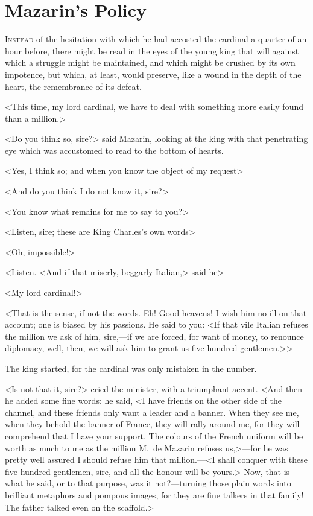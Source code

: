 \chapter{Mazarin's Policy}

\lettrine{I}{nstead} of the hesitation with which he had accosted the cardinal a quarter of an hour before, there might be read in the eyes of the young king that will against which a struggle might be maintained, and which might be crushed by its own impotence, but which, at least, would preserve, like a wound in the depth of the heart, the remembrance of its defeat.

<This time, my lord cardinal, we have to deal with something more easily found than a million.>

<Do you think so, sire?> said Mazarin, looking at the king with that penetrating eye which was accustomed to read to the bottom of hearts.

<Yes, I think so; and when you know the object of my request\longdash>

<And do you think I do not know it, sire?>

<You know what remains for me to say to you?>

<Listen, sire; these are King Charles's own words\longdash>

<Oh, impossible!>

<Listen. <And if that miserly, beggarly Italian,> said he\longdash>

<My lord cardinal!>

<That is the sense, if not the words. Eh! Good heavens! I wish him no ill on that account; one is biased by his passions. He said to you: <If that vile Italian refuses the million we ask of him, sire,—if we are forced, for want of money, to renounce diplomacy, well, then, we will ask him to grant us five hundred gentlemen.>>

The king started, for the cardinal was only mistaken in the number.

<Is not that it, sire?> cried the minister, with a triumphant accent. <And then he added some fine words: he said, <I have friends on the other side of the channel, and these friends only want a leader and a banner. When they see me, when they behold the banner of France, they will rally around me, for they will comprehend that I have your support. The colours of the French uniform will be worth as much to me as the million M.~de Mazarin refuses us,>—for he was pretty well assured I should refuse him that million.—<I shall conquer with these five hundred gentlemen, sire, and all the honour will be yours.> Now, that is what he said, or to that purpose, was it not?—turning those plain words into brilliant metaphors and pompous images, for they are fine talkers in that family! The father talked even on the scaffold.>

